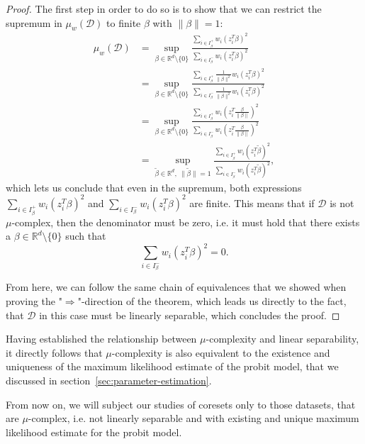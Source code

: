 \begin{proof}
The first step in order to do so is to show that we can restrict the
supremum in $\mu_w(\mathcal{D})$ to finite $\beta$ with
$\lVert \beta \rVert = 1$:
\begin{align*}
    \mu_w(\mathcal{D}) & = \sup_{\beta \in \mathbb{R}^d \setminus \{0\}}
    \frac{\sum_{i \in I_\beta^+} w_i (z_i^T \beta)^2}
    {\sum_{i \in I_\beta^-} w_i (z_i^T \beta)^2}                                         \\ & =
    \sup_{\beta \in \mathbb{R}^d \setminus \{0\}}
    \frac{\sum_{i \in I_\beta^+} \frac{1}{\lVert \beta \rVert^2}w_i (z_i^T \beta)^2}
    {\sum_{i \in I_\beta^-} \frac{1}{\lVert \beta \rVert^2} w_i (z_i^T \beta)^2}         \\
                       & =
    \sup_{\beta \in \mathbb{R}^d \setminus \{0\}}
    \frac{\sum_{i \in I_\beta^+} w_i \left(z_i^T \frac{\beta}{\lVert \beta \rVert}\right)^2}
    {\sum_{i \in I_\beta^-}  w_i \left(z_i^T \frac{\beta}{\lVert \beta \rVert}\right)^2} \\
                       & =
    \sup_{\tilde\beta \in \mathbb{R}^d,\ \lVert \tilde\beta \rVert = 1}
    \frac{\sum_{i \in I_\beta^+} w_i \left(z_i^T \tilde\beta \right)^2}
    {\sum_{i \in I_\beta^-}  w_i \left(z_i^T \tilde\beta \right)^2},
\end{align*}
which lets us conclude that even in the supremum, both expressions
$\sum_{i \in I_\beta^+} w_i (z_i^T \beta )^2$
and
$\sum_{i \in I_\beta^-}  w_i (z_i^T \beta )^2$
are finite.
This means that if $\mathcal{D}$ is not $\mu$-complex, then
the denominator must be zero, i.e. it must hold that there exists
a $\beta \in \mathbb{R}^d \setminus \{0\}$ such that
\begin{equation*}
    \sum_{i \in I_\beta^-}  w_i (z_i^T \beta )^2 = 0.
\end{equation*}

From here, we can follow the same chain of equivalences that we
showed when proving the "$\Rightarrow$"-direction of the theorem,
which leads us directly to the fact, that $\mathcal{D}$ in this case must
be linearly separable, which concludes the proof.
\end{proof}

Having established the relationship between $\mu$-complexity and
linear separability, it directly follows that $\mu$-complexity is
also equivalent to the existence and uniqueness of the
maximum likelihood estimate of the probit model, that we discussed
in section~\ref{sec:parameter-estimation}.

From now on, we will subject our studies of coresets only to
those datasets, that are $\mu$-complex, i.e. not linearly separable
and with existing and unique maximum likelihood estimate for the
probit model.

